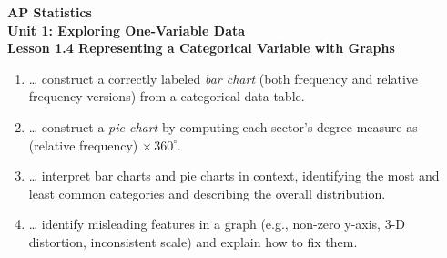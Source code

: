 \documentclass[10pt]{article}
\begin{document}
\vspace{-0.8in}

\begin{center}
  {\color{white}\textbf{\LARGE AP Statistics}}\\[4pt]
  {\color{skymid}\large\textbf{Unit 1: Exploring One-Variable Data}}\\[6pt]
  {\color{white}\textbf{\large Lesson 1.4 \quad Representing a Categorical Variable with Graphs}}
\end{center}

\vspace{0.22in}

\namedateperiod

\vspace{0.18in}

\begin{learningtargetbox}
\small
\begin{enumerate}[leftmargin=1.5em, itemsep=5pt]
  \item \ldots{} construct a correctly labeled \textit{bar chart} (both frequency
        and relative frequency versions) from a categorical data table.
  \item \ldots{} construct a \textit{pie chart} by computing each sector's degree
        measure as (relative frequency) $\times\,360^\circ$.
  \item \ldots{} interpret bar charts and pie charts in context, identifying the
        most and least common categories and describing the overall distribution.
  \item \ldots{} identify misleading features in a graph (e.g., non-zero y-axis,
        3-D distortion, inconsistent scale) and explain how to fix them.
\end{enumerate}
\end{learningtargetbox}

\vspace{0.14in}
\end{document}
